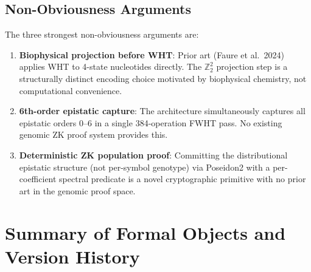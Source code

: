 \documentclass[12pt,letterpaper]{article}
\theoremstyle{definition}
\theoremstyle{plain}
\theoremstyle{remark}
\begin{document}
\subsection{Non-Obviousness Arguments}

The three strongest non-obviousness arguments are:

\begin{enumerate}
  \item \textbf{Biophysical projection before WHT}: Prior art (Faure et al.\ 2024) applies WHT to 4-state nucleotides directly. The $\mathbb{Z}_2^2$ projection step is a structurally distinct encoding choice motivated by biophysical chemistry, not computational convenience.
  \item \textbf{6th-order epistatic capture}: The architecture simultaneously captures all epistatic orders 0--6 in a single 384-operation FWHT pass. No existing genomic ZK proof system provides this.
  \item \textbf{Deterministic ZK population proof}: Committing the distributional epistatic structure (not per-symbol genotype) via Poseidon2 with a per-coefficient spectral predicate is a novel cryptographic primitive with no prior art in the genomic proof space.
\end{enumerate}

\section{Summary of Formal Objects and Version History}
\end{document}
